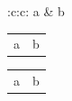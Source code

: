 \documentclass{article}
\begin{document}
\begin{tabular}{:c:c:}
a & b\\
\end{tabular}

\begin{tabular}{c@{\,}c}
a & b\\
\end{tabular}

\begin{tabular}{r@{\quad}l}
a & b\\
\end{tabular}
\end{document}
